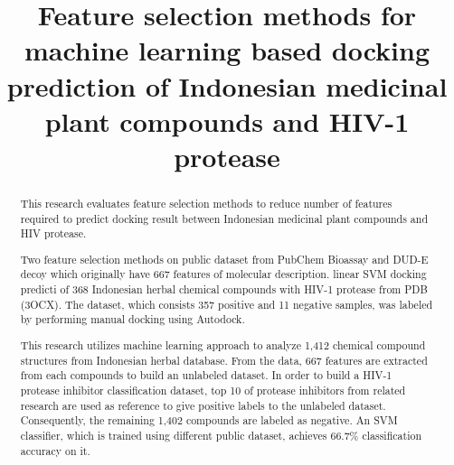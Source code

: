 \documentclass[conference,compsoc,12pt]{IEEEtran}
\begin{document}
\title{Feature selection methods for machine learning based docking prediction of Indonesian medicinal plant compounds and HIV-1 protease}



\author{
}

\maketitle

\begin{abstract}

This research evaluates feature selection methods to reduce number of features required to predict docking result between Indonesian medicinal plant compounds and HIV protease.  

Two feature selection methods on public dataset from PubChem Bioassay and DUD-E decoy which originally have 667 features of molecular description. linear SVM docking predicti of 368 Indonesian herbal chemical compounds with HIV-1 protease from PDB (3OCX). The dataset, which consists 357 positive and 11 negative samples, was labeled by performing manual docking using Autodock. 

This research utilizes machine learning approach to analyze 1,412 chemical compound structures from Indonesian herbal database. From the data, 667 features are extracted from each compounds to build an unlabeled dataset. In order to build a HIV-1 protease inhibitor classification dataset, top 10 of protease inhibitors from related research are used as reference to give positive labels to the unlabeled dataset. Consequently, the remaining 1,402 compounds are labeled as negative. An SVM classifier, which is trained using different public dataset, achieves 66.7\% classification accuracy on it.

\end{abstract}
\end{document}
